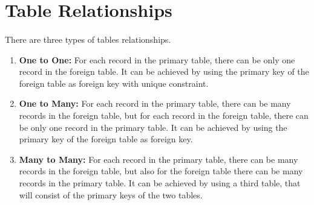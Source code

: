 
\section{Table Relationships}
\paragraph{} There are three types of tables relationships.
\begin{enumerate}
	\item \textbf{One to One:} For each record in the primary table, there can be only one record in the foreign table. It can be achieved by using the primary key of the foreign table as foreign key with unique constraint.
	\item \textbf{One to Many:} For each record in the primary table, there can be many records in the foreign table, but for each record in the foreign table, there can be only one record in the primary table. It can be achieved by using the primary key of the foreign table as foreign key.
	\item \textbf{Many to Many:} For each record in the primary table, there can be many records in the foreign table, but also for the foreign table there can be many records in the primary table. It can be achieved by using a third table, that will consist of the primary keys of the two tables.
\end{enumerate}
